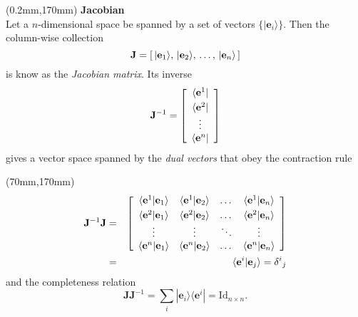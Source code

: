 \TPshowboxesfalse
\begin{textblock*}{70mm}(0.2mm,170mm)
{\centering \bf Jacobian}\\
  Let a $n$-dimensional space be spanned by a
  set of vectors $\{ | {\mathbf e}_i \rangle\}$.
  Then the column-wise collection
    \[
      {\mathbf J} = \left[\, |{\mathbf e}_1 \rangle, \, | {\mathbf e}_2 \rangle, \,  \dots , \, | {\mathbf e}_n \rangle \, \vspace{10mm} \right]
    \]
  is know as the \emph{Jacobian matrix}.  Its inverse
    \[
      {\mathbf J}^{-1} = \left[ \begin{array}{c} \langle {\mathbf e}^1 | \vspace{1mm}\\ \langle {\mathbf e}^2 | \\ \vdots \\ \langle {\mathbf e}^n | \end{array} \right]
    \]
    gives a vector space spanned by the \emph{dual vectors} that obey the contraction rule
\end{textblock*}
\begin{textblock*}{70mm}(70mm,170mm)
\begin{eqnarray*}
  {\mathbf J}^{-1} {\mathbf J} & = &  \left[ \begin{array}{cccc}
                 \langle {\mathbf e}^1 | {\mathbf e}_1 \rangle & \langle {\mathbf e}^1 | {\mathbf e}_2 \rangle & \dots & \langle {\mathbf e}^1 | {\mathbf e}_n \rangle \vspace{1mm}\\
                 \langle {\mathbf e}^2 | {\mathbf e}_1 \rangle & \langle {\mathbf e}^2 | {\mathbf e}_2 \rangle & \dots & \langle {\mathbf e}^2 | {\mathbf e}_n \rangle \\
	    	     \vdots                   &     \vdots                 & \ddots &   \vdots \\
                 \langle {\mathbf e}^n | {\mathbf e}_1 \rangle & \langle {\mathbf e}^n | {\mathbf e}_2 \rangle & \dots & \langle {\mathbf e}^n | {\mathbf e}_n \rangle \\
			   \end{array} \right] \\
		   & = & \langle {\mathbf e}^i | {\mathbf e}_j \rangle = {\delta^i}_j
\end{eqnarray*}
and the completeness relation
\[
  {\mathbf J} {\mathbf J}^{-1} = \sum_i | {\mathbf e}_i \rangle \langle {\mathbf e}^i | = \mbox{Id}_{n \times n} .
\]
\end{textblock*}


